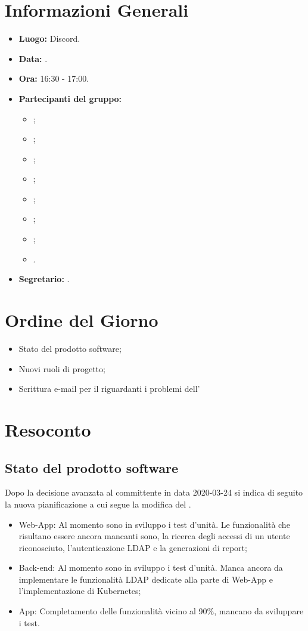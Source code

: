 \section{Informazioni Generali}
\begin{itemize}
\item \textbf{Luogo:} Discord.
\item \textbf{Data:} \Data.
\item \textbf{Ora:} 16:30 - 17:00.
\item \textbf{Partecipanti del gruppo:}
	\begin{itemize}
		\item \AT{}; 
		\item \BR{};
		\item \CE{}; 
		\item \DF{};
		\item \LD{};
		\item \MC{};
		\item \PF{};
		\item \SE{}.
	\end{itemize} 
\item \textbf{Segretario:} \PF{}.
\end{itemize}

\section{Ordine del Giorno}
\begin{itemize}
	\item Stato del prodotto software;
	\item Nuovi ruoli di progetto;
	\item Scrittura e-mail per il \CR{} riguardanti i problemi dell'\AdR 
\end{itemize}

\section{Resoconto}

\subsection{Stato del prodotto software}
Dopo la decisione avanzata al committente in data 2020-03-24 si indica di seguito la nuova pianificazione a cui segue la modifica del \PdP{}.
\begin{itemize}
	\item Web-App: Al momento sono in sviluppo i test d'unità. Le funzionalità che risultano essere ancora mancanti sono, la ricerca degli accessi di un utente riconosciuto, l'autenticazione LDAP e la generazioni di report;
	\item Back-end: Al momento sono in sviluppo i test d'unità. Manca ancora da implementare le funzionalità LDAP dedicate alla parte di Web-App e l'implementazione di Kubernetes;
	\item App: Completamento delle funzionalità vicino al 90\%, mancano da sviluppare i test.
\end{itemize}
